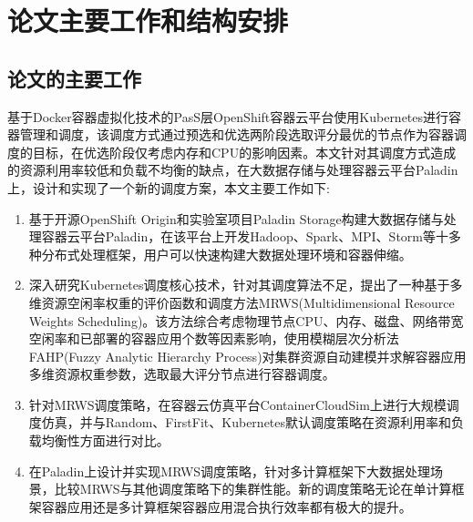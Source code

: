 \section{论文主要工作和结构安排}
\subsection{论文的主要工作}
基于Docker容器虚拟化技术的PasS层OpenShift容器云平台使用Kubernetes进行容器管理和调度，该调度方式通过预选和优选两阶段选取评分最优的节点作为容器调度的目标，在优选阶段仅考虑内存和CPU的影响因素。本文针对其调度方式造成的资源利用率较低和负载不均衡的缺点，在大数据存储与处理容器云平台Paladin上，设计和实现了一个新的调度方案，本文主要工作如下:
 \begin{enumerate}[(1)]
 \item 基于开源OpenShift Origin和实验室项目Paladin Storage构建大数据存储与处理容器云平台Paladin，在该平台上开发Hadoop、Spark、MPI、Storm等十多种分布式处理框架，用户可以快速构建大数据处理环境和容器伸缩。
\item 深入研究Kubernetes调度核心技术，针对其调度算法不足，提出了一种基于多维资源空闲率权重的评价函数和调度方法MRWS(Multidimensional Resource Weights Scheduling)。该方法综合考虑物理节点CPU、内存、磁盘、网络带宽空闲率和已部署的容器应用个数等因素影响，使用模糊层次分析法FAHP(Fuzzy Analytic Hierarchy Process)对集群资源自动建模并求解容器应用多维资源权重参数，选取最大评分节点进行容器调度。
\item 针对MRWS调度策略，在容器云仿真平台ContainerCloudSim上进行大规模调度仿真，并与Random、FirstFit、Kubernetes默认调度策略在资源利用率和负载均衡性方面进行对比。
\item 在Paladin上设计并实现MRWS调度策略，针对多计算框架下大数据处理场景，比较MRWS与其他调度策略下的集群性能。新的调度策略无论在单计算框架容器应用还是多计算框架容器应用混合执行效率都有极大的提升。
\end{enumerate}

